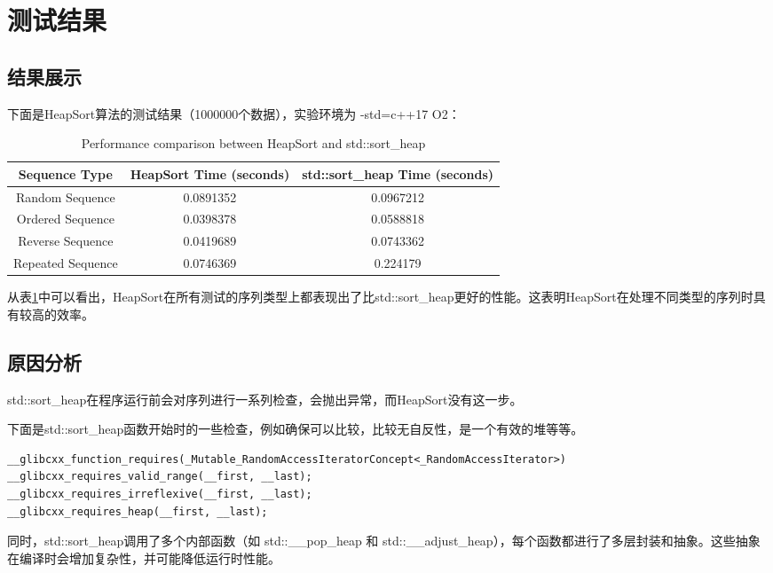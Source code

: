 \documentclass[UTF8]{ctexart}
\begin{document}
\section{测试结果}
\subsection{结果展示}
下面是HeapSort算法的测试结果（1000000个数据），实验环境为 -std=c++17 O2：
\begin{table}[H]
    \centering
    \begin{tabular}{|c|c|c|}
        \hline
        Sequence Type & HeapSort Time (seconds) & std::sort\_heap Time (seconds) \\
        \hline
        Random Sequence & 0.0891352 & 0.0967212 \\
        \hline
        Ordered Sequence & 0.0398378 & 0.0588818 \\
        \hline
        Reverse Sequence & 0.0419689 & 0.0743362 \\
        \hline
        Repeated Sequence & 0.0746369 & 0.224179 \\
        \hline
    \end{tabular}
    \caption{Performance comparison between HeapSort and std::sort\_heap}
    \label{tab:performance}
\end{table}

从表\ref{tab:performance}中可以看出，HeapSort在所有测试的序列类型上都表现出了比std::sort\_heap更好的性能。这表明HeapSort在处理不同类型的序列时具有较高的效率。

\subsection{原因分析}
std::sort\_heap在程序运行前会对序列进行一系列检查，会抛出异常，而HeapSort没有这一步。

下面是std::sort\_heap函数开始时的一些检查，例如确保可以比较，比较无自反性，是一个有效的堆等等。
\begin{lstlisting}
__glibcxx_function_requires(_Mutable_RandomAccessIteratorConcept<_RandomAccessIterator>)
__glibcxx_requires_valid_range(__first, __last);
__glibcxx_requires_irreflexive(__first, __last);
__glibcxx_requires_heap(__first, __last);
\end{lstlisting}

同时，std::sort\_heap调用了多个内部函数（如 std::\_\_pop\_heap 和 std::\_\_adjust\_heap），每个函数都进行了多层封装和抽象。这些抽象在编译时会增加复杂性，并可能降低运行时性能。
\end{document}
